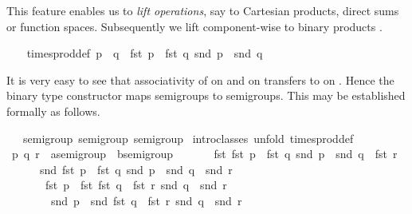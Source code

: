 \begin{isabellebody}
\begin{isamarkuptext}
  This feature enables us to \emph{lift operations}, say to Cartesian
  products, direct sums or function spaces.  Subsequently we lift
  \isa{{\isasymodot}} component-wise to binary products .%
\end{isamarkuptext}%
\isamarkuptrue%
\isamarkupfalse%
\ {\isacharparenleft}\isanewline
\ \ times{\isacharunderscore}prod{\isacharunderscore}def{\isacharcolon}\ {\isachardoublequoteopen}p\ {\isasymodot}\ q\ {\isasymequiv}\ {\isacharparenleft}fst\ p\ {\isasymodot}\ fst\ q{\isacharcomma}\ snd\ p\ {\isasymodot}\ snd\ q{\isacharparenright}{\isachardoublequoteclose}%
\begin{isamarkuptext}%
It is very easy to see that associativity of \isa{{\isasymodot}} on 
  and \isa{{\isasymodot}} on  transfers to \isa{{\isasymodot}} on .  Hence the binary type constructor \isa{{\isasymodot}} maps semigroups
  to semigroups.  This may be established formally as follows.%
\end{isamarkuptext}%
\isamarkuptrue%
\isamarkupfalse%
\ {\isacharasterisk}\ {\isacharcolon}{\isacharcolon}\ {\isacharparenleft}semigroup{\isacharcomma}\ semigroup{\isacharparenright}\ semigroup\isanewline
%
\isadelimproof
%
\endisadelimproof
%
\isatagproof
{}\isamarkupfalse%
\ {\isacharparenleft}intro{\isacharunderscore}classes{\isacharcomma}\ unfold\ times{\isacharunderscore}prod{\isacharunderscore}def{\isacharparenright}\isanewline
\ \ \isamarkupfalse%
\ p\ q\ r\ {\isacharcolon}{\isacharcolon}\ {\isachardoublequoteopen}{\isacharprime}a{\isasymColon}semigroup\ {\isasymtimes}\ {\isacharprime}b{\isasymColon}semigroup{\isachardoublequoteclose}\isanewline
\ \ \isamarkupfalse%
\isanewline
\ \ \ \ {\isachardoublequoteopen}{\isacharparenleft}fst\ {\isacharparenleft}fst\ p\ {\isasymodot}\ fst\ q{\isacharcomma}\ snd\ p\ {\isasymodot}\ snd\ q{\isacharparenright}\ {\isasymodot}\ fst\ r{\isacharcomma}\isanewline
\ \ \ \ \ \ snd\ {\isacharparenleft}fst\ p\ {\isasymodot}\ fst\ q{\isacharcomma}\ snd\ p\ {\isasymodot}\ snd\ q{\isacharparenright}\ {\isasymodot}\ snd\ r{\isacharparenright}\ {\isacharequal}\isanewline
\ \ \ \ \ \ \ {\isacharparenleft}fst\ p\ {\isasymodot}\ fst\ {\isacharparenleft}fst\ q\ {\isasymodot}\ fst\ r{\isacharcomma}\ snd\ q\ {\isasymodot}\ snd\ r{\isacharparenright}{\isacharcomma}\isanewline
\ \ \ \ \ \ \ \ snd\ p\ {\isasymodot}\ snd\ {\isacharparenleft}fst\ q\ {\isasymodot}\ fst\ r{\isacharcomma}\ snd\ q\ {\isasymodot}\ snd\ r{\isacharparenright}{\isacharparenright}{\isachardoublequoteclose}\isanewline

\end{isabellebody}
